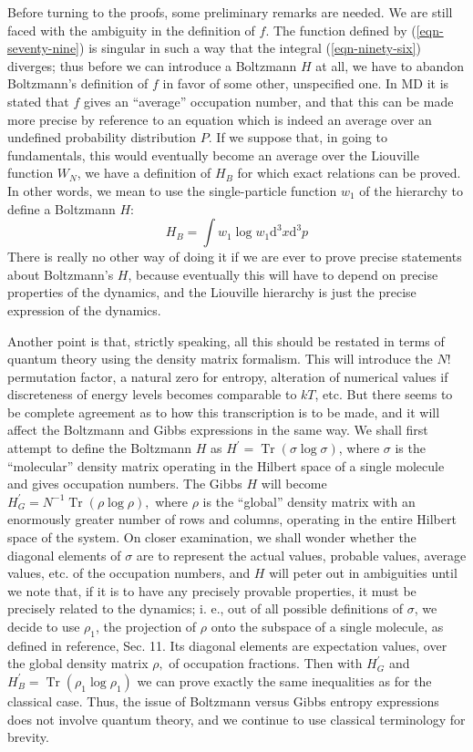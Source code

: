 \documentclass[]{article}
\begin{document}
Before turning to the proofs, some preliminary remarks are needed. We are still faced with the ambiguity in the definition of $f$. The function defined by (\ref{eqn-seventy-nine}) is singular in such a way that the integral (\ref{eqn-ninety-six}) diverges; thus before we can introduce a Boltzmann $H$ at all, we have to abandon Boltzmann's definition of $f$ in favor of some other, unspecified one. In MD it is stated that $f$ gives an ``average'' occupation number, and that this can be made more precise by reference to an equation which is indeed an average over an undefined probability distribution $P$. If we suppose that, in going to fundamentals, this would eventually become an average over the Liouville function $W _{ N }$, we have a definition of $H _{ B }$ for which exact relations can be proved. In other words, we mean to use the single-particle function $w_{1}$ of the hierarchy to define a Boltzmann $H$:
\begin{equation}
H_{B}=\int w_{1} \log w_{1}\text{d}^{3} x\text{d}^{3} p \label{eqn-ninety-eight}
\end{equation}
There is really no other way of doing it if we are ever to prove precise statements about Boltzmann's $H$, because eventually this will have to depend on precise properties of the dynamics, and the Liouville hierarchy is just the precise expression of the dynamics. 

Another point is that, strictly speaking, all this should be restated in terms of quantum theory using the density matrix formalism. This will introduce the $N!$ permutation factor, a natural zero for entropy, alteration of numerical values if discreteness of energy levels becomes comparable to $kT$, etc. But there seems to be complete agreement as to how this transcription is to be made, and it will affect the Boltzmann and Gibbs expressions in the same way. We shall first attempt to define the Boltzmann $H$ as $H^{\prime}=\operatorname{Tr}(\sigma \log \sigma)$, where $\sigma$ is the ``molecular'' density matrix operating in the Hilbert space of a single molecule and gives occupation numbers. The Gibbs $H$ will become $H _{ G }^{\prime}= N ^{-1} \operatorname{Tr} (\rho \log \rho),$ where $\rho$
is the ``global'' density matrix with an enormously greater number of rows and columns, operating in the entire Hilbert space of the system. On closer examination, we shall wonder whether the diagonal elements of $\sigma$ are to represent the actual values, probable values, average values, etc. of the occupation numbers, and $H$ will peter out in ambiguities until we note that, if it is to have any precisely provable properties, it must be precisely related to the dynamics; i. e., out of all possible definitions of $\sigma$, we decide to use $\rho_{1}$, the projection of $\rho$ onto the subspace of a single molecule, as defined in reference,\citep{Jaynes-information-II-57} Sec. 11. Its diagonal elements are expectation values, over the global density matrix $\rho,$ of occupation fractions. Then with $H _{ G }^\prime$ and $H _{ B }^\prime=\operatorname{Tr}\left(\rho_{1} \log \rho_{1}\right)$ we can prove exactly the same inequalities as for the classical case. Thus, the issue of Boltzmann versus Gibbs entropy expressions does not involve quantum theory, and we continue to use classical terminology for brevity.
\end{document}
